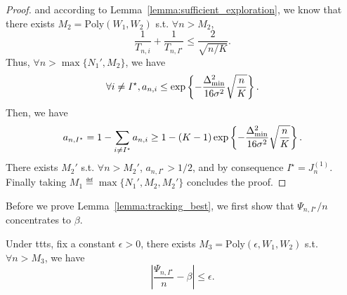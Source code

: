 \begin{proof}
    and according to Lemma~\ref{lemma:sufficient_exploration}, we know that there exists $M_2 = \text{Poly}(W_1,W_2)$ s.t. $\forall n > M_2$,
    \[
        \frac{1}{T_{n,i}}+\frac{1}{T_{n,I^\star}} \leq \frac{2}{\sqrt{n/K}}.
    \]
    Thus, $\forall n > \max\{N_1',M_2\}$, we have
    \[
        \forall i\neq I^\star, a_{n,i} \leq \exp\left\{-\frac{\Delta_{\text{min}}^2}{16\sigma^2}\sqrt{\frac{n}{K}}\right\}.
    \]
    Then, we have
    \[
        a_{n,I^\star} = 1 - \sum_{i\neq I^\star} a_{n,i} \geq 1-(K-1)\exp\left\{-\frac{\Delta_{\text{min}}^2}{16\sigma^2}\sqrt{\frac{n}{K}}\right\}.
    \]
    There exists $M_2'$ s.t. $\forall n > M_2'$, $a_{n,I^\star}>1/2$, and by consequence $I^\star = J_n^{(1)}$. Finally taking $M_1 \eqdef \max\{N_1', M_2, M_2'\}$ concludes the proof.
\end{proof}

Before we prove Lemma~\ref{lemma:tracking_best}, we first show that $\Psi_{n,I^\star}/n$ concentrates to $\beta$.

\begin{lemma}\label{lemma:psi_best}
\begin{leftbar}[lemmabar]
    Under \gls{ttts}, fix a constant $\epsilon>0$, there exists $M_3 = \text{Poly}(\epsilon,W_1,W_2)$ s.t. $\forall n > M_3$, we have
    \[
        \left| \frac{\Psi_{n,I^\star}}{n}-\beta \right| \leq \epsilon.
    \]
\end{leftbar}
\end{lemma}

